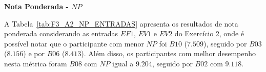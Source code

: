 
\textbf{Nota Ponderada - $NP$}

A Tabela~\ref{tab:F3_A2_NP_ENTRADAS} apresenta os resultados de nota ponderada considerando as entradas $EF1$, $EV1$ e $EV2$ do Exercício 2, onde é possível notar que o participante com menor $NP$ foi $B10$ ($7.509$), seguido por $B03$ ($8.156$) e por $B06$ ($8.413$). Além disso, os participantes com melhor desempenho nesta métrica foram $B08$ com $NP$ igual a $9.204$, seguido por $B02$ com $9.118$.

